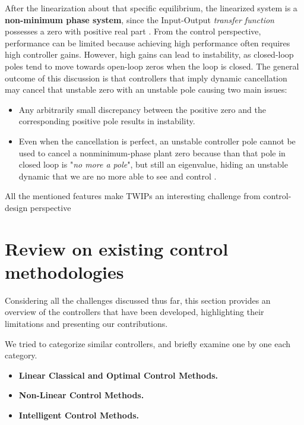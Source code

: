 After the linearization about that specific equilibrium, the linearized system is a \textbf{non-minimum phase system}, since the Input-Output \textit{transfer function} possesses a zero with positive real part \cite{Slotine1991AppliedNC, Hoagg-Nonminimum-phase-zeros}.
From the control perspective, performance can be limited because achieving high performance often requires high controller gains. However, high gains can lead to instability, as closed-loop poles tend to move towards open-loop zeros when the loop is closed.
The general outcome of this discussion is that controllers that imply dynamic cancellation may cancel that unstable zero with an unstable pole causing two main issues:

\begin{itemize}
    \item Any arbitrarily small discrepancy between the positive zero and the corresponding positive pole results in instability.  
    \item Even when the cancellation is perfect, an unstable controller pole cannot be used to cancel a nonminimum-phase plant zero because than that pole in closed loop is "\textit{no more a pole}", but still an eigenvalue, hiding an unstable dynamic that we are no more able to see and control \cite{Zhou1997EssentialsOR}.
\end{itemize}

All the mentioned features make TWIPs an interesting challenge from control-design perspective

\section{Review on existing control methodologies}
\label{sec:Review on existing control methodologies}

Considering all the challenges discussed thus far, this section provides an overview of the controllers that have been developed, highlighting their limitations and presenting our contributions.

We tried to categorize similar controllers, and briefly examine one by one each category.
\\

\begin{itemize}
    \item \textbf{Linear Classical and Optimal Control Methods.}  
    \item \textbf{Non-Linear Control Methods.} 
    \item \textbf{Intelligent Control Methods.} 
\end{itemize}


